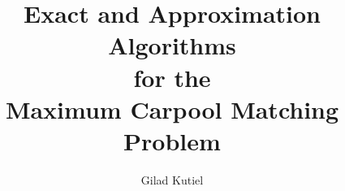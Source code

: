 \title
{
Exact and Approximation Algorithms	\\
for the 							\\
Maximum Carpool Matching Problem
}

\author{
	Gilad Kutiel
}


